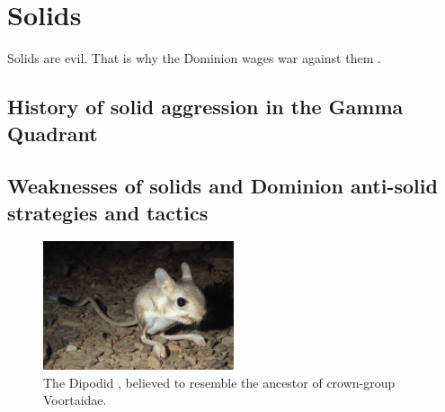 


\chapter{Solids}
Solids are evil. That is why the Dominion wages war against them \citep{Son-of-Moog:2488}.

\section{History of solid aggression in the Gamma Quadrant}
\section{Weaknesses of solids and Dominion anti-solid strategies and tactics}
\begin{figure}[h!]
 \label{jaculus}
 \centering
  \includegraphics[width=0.5\textwidth]{ch-solids/figures/jaculus.jpg}
 \caption{The Dipodid , believed to resemble the ancestor of crown-group Voortaidae.}
\end{figure}




